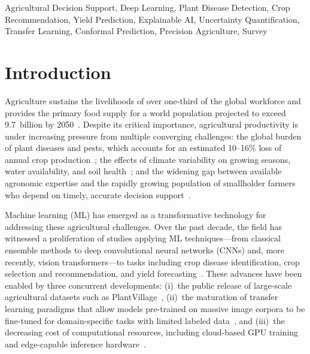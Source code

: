 \documentclass[journal]{IEEEtran}
\begin{document}
\begin{IEEEkeywords}
Agricultural Decision Support, Deep Learning, Plant Disease Detection, Crop Recommendation, Yield Prediction, Explainable AI, Uncertainty Quantification, Transfer Learning, Conformal Prediction, Precision Agriculture, Survey
\end{IEEEkeywords}

\section{Introduction}
\label{sec:introduction}

Agriculture sustains the livelihoods of over one-third of the global workforce and provides the primary food supply for a world population projected to exceed 9.7~billion by 2050~\cite{fao2021state}. Despite its critical importance, agricultural productivity is under increasing pressure from multiple converging challenges: the global burden of plant diseases and pests, which accounts for an estimated 10--16\% loss of annual crop production~\cite{savary2019global}; the effects of climate variability on growing seasons, water availability, and soil health~\cite{lipper2014climate}; and the widening gap between available agronomic expertise and the rapidly growing population of smallholder farmers who depend on timely, accurate decision support~\cite{wolfert2017big}.

Machine learning (ML) has emerged as a transformative technology for addressing these agricultural challenges. Over the past decade, the field has witnessed a proliferation of studies applying ML techniques---from classical ensemble methods to deep convolutional neural networks (CNNs) and, more recently, vision transformers---to tasks including crop disease identification, crop selection and recommendation, and yield forecasting~\cite{liakos2018machine,kamilaris2018deep}. These advances have been enabled by three concurrent developments: (i)~the public release of large-scale agricultural datasets such as PlantVillage~\cite{hughes2015open}, (ii)~the maturation of transfer learning paradigms that allow models pre-trained on massive image corpora to be fine-tuned for domain-specific tasks with limited labeled data~\cite{deng2009imagenet}, and (iii)~the decreasing cost of computational resources, including cloud-based GPU training and edge-capable inference hardware~\cite{chen2019deep}.
\end{document}
